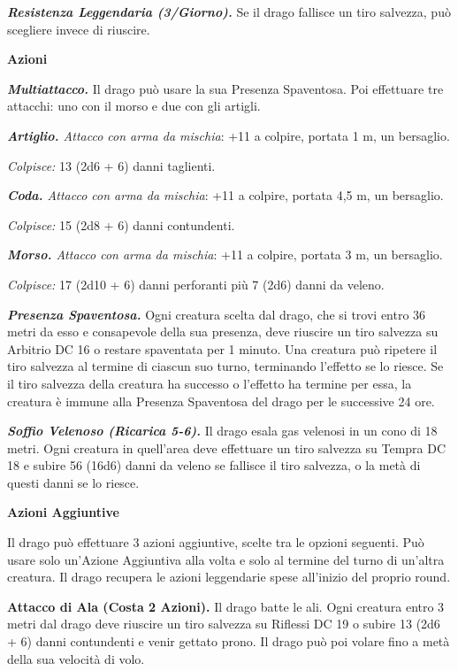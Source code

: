 \begin{multicols}{2}
\emph{\textbf{Resistenza Leggendaria (3/Giorno).}} Se il drago fallisce
un tiro salvezza, può scegliere invece di riuscire.

\smallskip\textbf{Azioni}

\emph{\textbf{Multiattacco.}} Il drago può usare la sua Presenza
Spaventosa. Poi effettuare tre attacchi: uno con il morso e due con gli
artigli.

\emph{\textbf{Artiglio.} Attacco con arma da mischia}: +11 a colpire,
portata 1 m, un bersaglio.

\emph{Colpisce:} 13 (2d6 + 6) danni taglienti.

\emph{\textbf{Coda.} Attacco con arma da mischia}: +11 a colpire,
portata 4,5 m, un bersaglio.

\emph{Colpisce:} 15 (2d8 + 6) danni contundenti.

\emph{\textbf{Morso.} Attacco con arma da mischia}: +11 a colpire,
portata 3 m, un bersaglio.

\emph{Colpisce:} 17 (2d10 + 6) danni perforanti più 7 (2d6) danni da
veleno.

\emph{\textbf{Presenza Spaventosa.}} Ogni creatura scelta dal drago, che
si trovi entro 36 metri da esso e consapevole della sua presenza, deve
riuscire un tiro salvezza su Arbitrio DC 16 o restare spaventata per 1
minuto. Una creatura può ripetere il tiro salvezza al termine di ciascun
suo turno, terminando l'effetto se lo riesce. Se il tiro salvezza della
creatura ha successo o l'effetto ha termine per essa, la creatura è
immune alla Presenza Spaventosa del drago per le successive 24 ore.

\emph{\textbf{Soffio Velenoso (Ricarica 5-6).}} Il drago esala gas
velenosi in un cono di 18 metri. Ogni creatura in quell'area deve
effettuare un tiro salvezza su Tempra DC 18 e subire 56 (16d6)
danni da veleno se fallisce il tiro salvezza, o la metà di questi danni
se lo riesce.

\textbf{Azioni Aggiuntive}

Il drago può effettuare 3 azioni aggiuntive, scelte tra le opzioni
seguenti. Può usare solo un'Azione Aggiuntiva alla volta e solo al
termine del turno di un'altra creatura. Il drago recupera le azioni
leggendarie spese all'inizio del proprio round.

\textbf{Attacco di Ala (Costa 2 Azioni).} Il drago batte le ali. Ogni
creatura entro 3 metri dal drago deve riuscire un tiro salvezza su Riflessi DC 19 o subire 13 (2d6 + 6) danni contundenti e venir gettato
prono. Il drago può poi volare fino a metà della sua velocità di volo.


\end{multicols}
